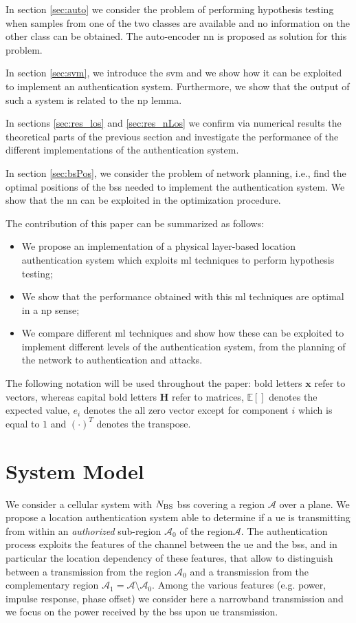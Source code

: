 \documentclass[draftcls,onecolumn,12pt]{IEEEtran}
\begin{document}
In section \ref{sec:auto} we consider the problem of performing hypothesis testing when samples from one of the two classes are available and no information on the other class can be obtained. The auto-encoder \ac{nn} is proposed as solution for this problem.

In section \ref{sec:svm}, we introduce the \ac{svm} and we show how it can be exploited to implement an authentication system. Furthermore, we show that the output of such a system is related to the \ac{np} lemma.

In sections \ref{sec:res_los} and \ref{sec:res_nLos} we confirm via numerical results the theoretical parts of the previous section and investigate the performance of the different implementations of the authentication system.

In section \ref{sec:bsPos}, we consider the problem of network planning, i.e., find the optimal positions of the \acp{bs} needed to implement the authentication system. We show that the \ac{nn} can be exploited in the optimization procedure.

The contribution of this paper can be summarized as follows:
\begin{itemize}
    \item We propose an implementation of a physical layer-based location authentication system which exploits \ac{ml} techniques to perform hypothesis testing;
    \item We show that the performance obtained with this \ac{ml} techniques are optimal in a \ac{np} sense;
    \item We compare different \ac{ml} techniques and show how these can be exploited to implement different levels of the authentication system, from the planning of the network to authentication and attacks.
\end{itemize}

The following notation will be used throughout the paper: bold letters $\bm{x}$ refer to vectors, whereas capital bold letters $\bm{H}$ refer to matrices, $\mathbb{E}[]$ denotes the expected value, $e_i$ denotes the all zero vector except for component $i$ which is equal to $1$ and $(\cdot)^T$ denotes the transpose.

\section{System Model}
We consider a cellular system with $N_{\rm BS}$ \acp{bs} covering a region $\mathcal{A}$ over a plane. We propose a location authentication system able to determine if a \ac{ue} is transmitting from within an {\em authorized} sub-region $\mathcal{A}_0$ of the region$\mathcal{A}$. The authentication process exploits the features of the channel between the \ac{ue} and the \acp{bs}, and in particular the location dependency of these features, that allow to distinguish between a transmission from the region $\mathcal{A_0}$ and a transmission from the complementary region $\mathcal{A}_1=\mathcal{A} \setminus \mathcal{A}_0$. Among the various features (e.g. power, impulse response, phase offset) we consider here a narrowband transmission and we focus on the power received by the \acp{bs} upon \ac{ue} transmission.
\end{document}

